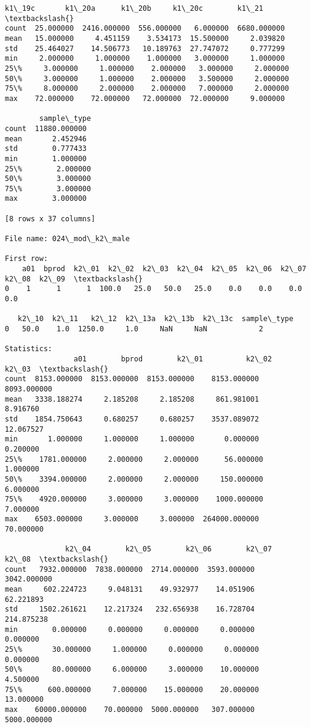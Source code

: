 \documentclass[11pt]{article}
\begin{document}
\begin{Verbatim}[commandchars=\\\{\}]
          k1\_19c       k1\_20a      k1\_20b     k1\_20c        k1\_21  \textbackslash{}
count  25.000000  2416.000000  556.000000   6.000000  6680.000000   
mean   15.000000     4.451159    3.534173  15.500000     2.039820   
std    25.464027    14.506773   10.189763  27.747072     0.777299   
min     2.000000     1.000000    1.000000   3.000000     1.000000   
25\%     3.000000     1.000000    2.000000   3.000000     2.000000   
50\%     3.000000     1.000000    2.000000   3.500000     2.000000   
75\%     8.000000     2.000000    2.000000   7.000000     2.000000   
max    72.000000    72.000000   72.000000  72.000000     9.000000   

        sample\_type  
count  11880.000000  
mean       2.452946  
std        0.777433  
min        1.000000  
25\%        2.000000  
50\%        3.000000  
75\%        3.000000  
max        3.000000  

[8 rows x 37 columns]

File name: 024\_mod\_k2\_male

First row: 
    a01  bprod  k2\_01  k2\_02  k2\_03  k2\_04  k2\_05  k2\_06  k2\_07  k2\_08  k2\_09  \textbackslash{}
0    1      1      1  100.0   25.0   50.0   25.0    0.0    0.0    0.0    0.0   

   k2\_10  k2\_11   k2\_12  k2\_13a  k2\_13b  k2\_13c  sample\_type  
0   50.0    1.0  1250.0     1.0     NaN     NaN            2  

Statistics: 
                a01        bprod        k2\_01          k2\_02        k2\_03  \textbackslash{}
count  8153.000000  8153.000000  8153.000000    8153.000000  8093.000000   
mean   3338.188274     2.185208     2.185208     861.981001     8.916760   
std    1854.750643     0.680257     0.680257    3537.089072    12.067527   
min       1.000000     1.000000     1.000000       0.000000     0.200000   
25\%    1781.000000     2.000000     2.000000      56.000000     1.000000   
50\%    3394.000000     2.000000     2.000000     150.000000     6.000000   
75\%    4920.000000     3.000000     3.000000    1000.000000     7.000000   
max    6503.000000     3.000000     3.000000  264000.000000    70.000000   

              k2\_04        k2\_05        k2\_06        k2\_07        k2\_08  \textbackslash{}
count   7932.000000  7838.000000  2714.000000  3593.000000  3042.000000   
mean     602.224723     9.048131    49.932977    14.051906    62.221893   
std     1502.261621    12.217324   232.656938    16.728704   214.875238   
min        0.000000     0.000000     0.000000     0.000000     0.000000   
25\%       30.000000     1.000000     0.000000     0.000000     0.000000   
50\%       80.000000     6.000000     3.000000    10.000000     4.500000   
75\%      600.000000     7.000000    15.000000    20.000000    13.000000   
max    60000.000000    70.000000  5000.000000   307.000000  5000.000000   


\end{Verbatim}
\end{document}
